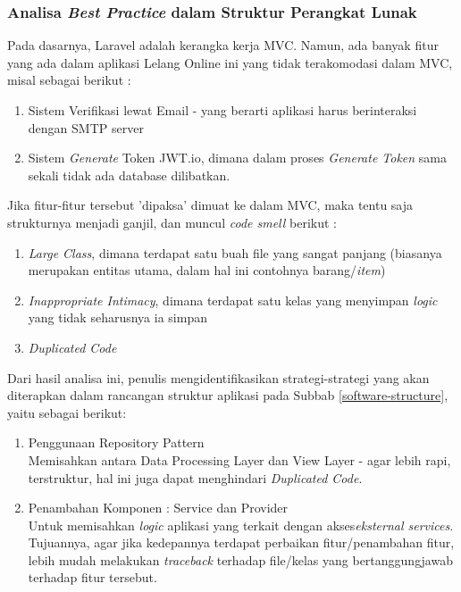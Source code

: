 	\subsubsection{Analisa \textit{Best Practice} dalam Struktur Perangkat Lunak}
		\label{alasan-best-practice}
		Pada dasarnya, Laravel adalah kerangka kerja MVC. Namun, ada banyak fitur yang ada dalam aplikasi Lelang Online ini yang tidak terakomodasi dalam MVC, misal sebagai berikut :
		\begin{enumerate}
			\item Sistem Verifikasi lewat Email - yang berarti aplikasi harus berinteraksi dengan SMTP server
			\item Sistem \textit{Generate} Token JWT.io, dimana dalam proses \textit{Generate Token} sama sekali tidak ada database dilibatkan.
		\end{enumerate}
		\indent Jika fitur-fitur tersebut 'dipaksa' dimuat ke dalam MVC, maka tentu saja strukturnya menjadi ganjil, dan muncul \textit{code smell} berikut :
		\begin{enumerate}
			\item \textit{Large Class}, dimana terdapat satu buah file yang sangat panjang (biasanya merupakan entitas utama, dalam hal ini contohnya barang/\textit{item})
			\item \textit{Inappropriate Intimacy}, dimana terdapat satu kelas yang menyimpan \textit{logic} yang tidak seharusnya ia simpan
			\item \textit{Duplicated Code}
		\end{enumerate}		
		\indent Dari hasil analisa ini, penulis mengidentifikasikan strategi-strategi yang akan diterapkan dalam rancangan struktur aplikasi pada Subbab \ref{software-structure}, yaitu sebagai berikut:
			\begin{enumerate}
				\item Penggunaan Repository Pattern
				\\ Memisahkan antara Data Processing Layer dan View Layer - agar lebih rapi, terstruktur, hal ini juga dapat menghindari \textit{Duplicated Code}.
				\item Penambahan Komponen : Service dan Provider \\
				Untuk memisahkan \textit{logic} aplikasi yang terkait dengan akses\textit{eksternal services}. Tujuannya, agar jika kedepannya terdapat perbaikan fitur/penambahan fitur, lebih mudah melakukan \textit{traceback} terhadap file/kelas yang bertanggungjawab terhadap fitur tersebut.
			\end{enumerate}
	
